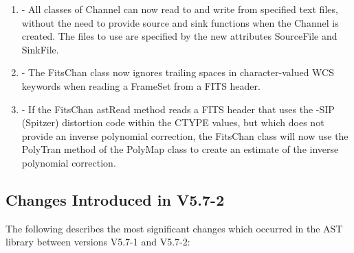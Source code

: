 \documentclass[twoside,11pt]{article}
\begin{document}
\begin{enumerate}

\item - All classes of Channel can now read to and write from specified
text files, without the need to provide source and sink functions when
the Channel is created. The files to use are specified by the new
attributes SourceFile and SinkFile.

\item - The FitsChan class now ignores trailing spaces in character-valued WCS
keywords when reading a FrameSet from a FITS header.

\item - If the FitsChan astRead method reads a FITS header that uses the
-SIP (Spitzer) distortion code within the CTYPE values, but which does
not provide an inverse polynomial correction, the FitsChan class will now
use the PolyTran method of the PolyMap class to create an estimate of the
inverse polynomial correction.

\end{enumerate}


\subsection{Changes Introduced in V5.7-2}

The following describes the most significant changes which
occurred in the AST library between versions V5.7-1 and V5.7-2:
\end{document}
